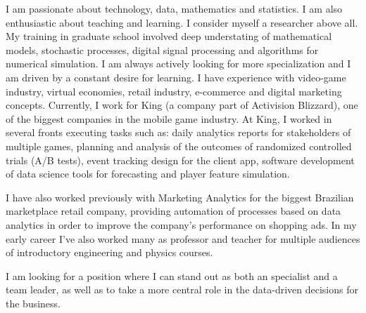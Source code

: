 


I am passionate about technology, data, mathematics and statistics. I am also enthusiastic about teaching and learning.
%
I consider myself a researcher above all. 
My training in graduate school involved deep understating of 
mathematical models, 
stochastic processes, 
digital signal processing and 
algorithms for numerical simulation. 
I am always actively looking for more specialization and 
I am driven by a constant desire for learning. 
%
I have experience with 
video-game industry, 
virtual economies, 
retail industry, 
e-commerce and 
digital marketing concepts.
%
Currently, I work for 
King (a company part of Activision Blizzard), one of the biggest companies in the mobile game industry. 
%
At King, I worked in several fronts executing tasks such as:
daily analytics reports for stakeholders of multiple games,
planning and analysis of the outcomes of randomized controlled trials  (A/B tests),
event tracking design for the client app,
software development of data science tools for forecasting and player feature simulation.

I have also worked previously with Marketing Analytics for the biggest Brazilian marketplace retail company, providing automation of processes based on data analytics in order to improve the company's performance on shopping ads. In my early career I've also worked many as professor and teacher for multiple audiences of introductory engineering and physics courses.

I am looking for a position where I can stand out as both an specialist and a team leader, as well as to take a more central role in the data-driven decisions for the business. 